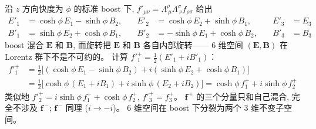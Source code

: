 沿 $z$ 方向快度为 $\phi$ 的标准 boost 下,
$f'_{\mu\nu}=\Lambda^\rho_{\ \mu}\Lambda^\sigma_{\ \nu}f_{\rho\sigma}$ 给出
\begin{subequations}\label{eq:boost-EB}
\begin{align}
    E'_1 &= \cosh\phi\,E_1 - \sinh\phi\,B_2, &\quad 
    E'_2 &= \cosh\phi\,E_2 + \sinh\phi\,B_1, &\quad 
    E'_3 &= E_3 \label{eq:boost-E}\\
    B'_1 &= \sinh\phi\,E_2 + \cosh\phi\,B_1, &\quad  
    B'_2 &= -\sinh\phi\,E_1 + \cosh\phi\,B_2, &\quad  
    B'_3 &= B_3 \label{eq:boost-B}
\end{align}
\end{subequations}
boost 混合 $\boldsymbol{E}$ 和 $\boldsymbol{B}$, 
而旋转把 $\boldsymbol{E}$ 和 $\boldsymbol{B}$ 各自内部旋转——
6 维空间 $(\boldsymbol{E},\boldsymbol{B})$ 在 Lorentz 群下不是不可约的。
计算 $f'^+_1=\frac{1}{2}(E'_1+iB'_1)$：
\begin{align}
    f'^+_1 &= \tfrac{1}{2}\bigl[(\cosh\phi\,E_1-\sinh\phi\,B_2)
    +i(\sinh\phi\,E_2+\cosh\phi\,B_1)\bigr] \nonumber\\
    &= \tfrac{1}{2}\bigl[\cosh\phi\,(E_1+iB_1)+i\sinh\phi\,(E_2+iB_2)\bigr]
    = \cosh\phi\,f^+_1 + i\sinh\phi\,f^+_2
\end{align}
类似地
$f'^+_2 = i\sinh\phi\,f^+_1+\cosh\phi\,f^+_2$, $f'^+_3=f^+_3$。
$\boldsymbol{f}^{\,+}$ 的三个分量只和自己混合, 完全不涉及 $\boldsymbol{f}^{\,-}$;
$\boldsymbol{f}^{\,-}$ 同理 ($i\to-i$)。
6 维空间在 boost 下分裂为两个 3 维不变子空间。

